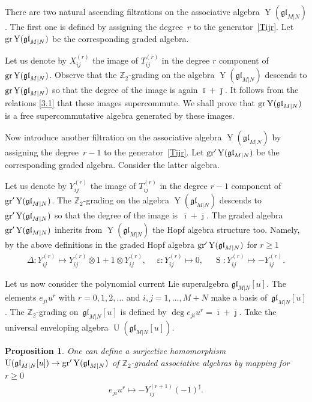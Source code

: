 \documentclass[10pt,a4paper]{amsart}
\numberwithin{equation}{section}
\newtheorem{Proposition}[Theorem]{Proposition}
\def\bi{{\bar\imath }}
\def\bj{{\bar\jmath }}
\def\De{\Delta}
\def\ep{\varepsilon}
\def\g{\glMN [u]}
\def\ge{\geqslant}
\def\glMN{\mathfrak{gl}_{M|N}}
\def\gr{{\rm gr} }
\def\grpr{{\rm gr}^{\prime} }
\def\ot{\otimes}
\def\S{\operatorname{S}}
\def\Ug{\operatorname{U}(\g)}
\def\YMN{\operatorname{Y}(\glMN)}
\def\ZZ{\mathbb{Z}}
\begin{document}
There are two natural
ascending filtrations on
the associative algebra $\YMN $. The first one is defined by
assigning the degree~$r$ to the generator~\eqref{Tijr}.
Let $\gr\YMN$ be the corresponding graded algebra.

Let us denote by $X_{ij}^{(r)}$ the image of $T_{ij}^{(r)}$
in the degree $r$ component of $\gr\YMN $.
Observe that the $\ZZ_2 $-grading on the algebra $\YMN$ descends to
$\gr\YMN$ so that the degree of the image is again
$\bi + \bj $. It follows from the relations \eqref{3.1}
that these images supercommute.
We shall prove that
$\gr\YMN$ is a free supercommutative algebra generated by
these images.

Now introduce another filtration on the associative algebra $\YMN$
by assigning the deg\-ree~$r-1$ to the generator~\eqref{Tijr}.
Let $\grpr\YMN$ be the corresponding graded algebra.
Consider the latter algebra.

Let us denote by $Y_{ij}^{(r)}$ the image of $T_{ij}^{(r)}$
in the degree $r-1$ component of $\grpr\YMN $.
The $\ZZ_2 $-grading on the algebra
$\YMN$ descends to
$\grpr\YMN$ so that the degree of the image is~$\bi + \bj $.
The graded algebra $\grpr\YMN$ inherits from $\YMN$ the Hopf algebra structure too.
Namely, by the above definitions in
the graded Hopf algebra $\grpr\YMN$ for $r\ge1$ %
\begin{gather}
\label{grprH}
\De: Y_{ij}^{(r)}\mapsto Y_{ij}^{(r)}\ot1+1\ot Y_{ij}^{(r)} ,
\ \quad
\ep: Y_{ij}^{(r)}\mapsto0 ,
\ \quad
\S: Y_{ij}^{(r)}\mapsto- Y_{ij}^{(r)} .
\end{gather}

Let us now consider the polynomial current Lie superalgebra $\g $.
The elements $e_{ji} u^{r}$ with $r=0 ,1 ,2 , \dots$
and $i ,j=1 ,\dots, M+N$ make a basis of~$\g $.
The $\ZZ_{2}$-grading on~$\g$ is defined by
$\deg e_{ji} u^{r}=\bi+\bj $. Take
the universal enveloping algebra $\Ug $.

\begin{Proposition}
\label{P21}
One can define a surjective homomorphism $\Ug\to\grpr\YMN$
of $\ZZ_2$-graded associative algebras by mapping for $r\ge0$
\begin{gather}
\label{UY}
e_{ji} u^r\mapsto- Y_{ij}^{(r+1)} {(-1)}^{\bj} .
\end{gather}
\end{Proposition}
\end{document}
